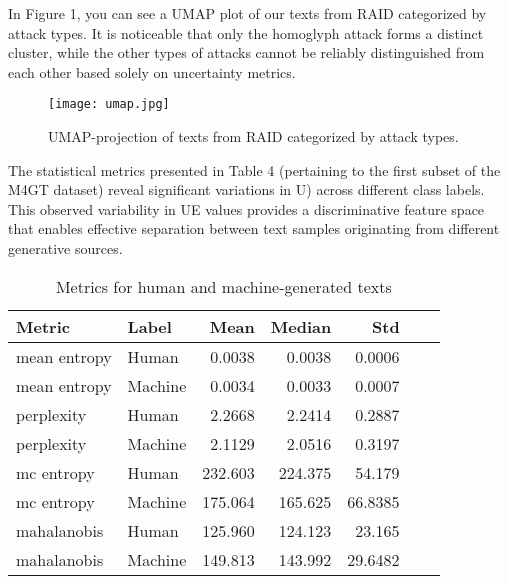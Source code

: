 \documentclass[a4paper, 12pt]{article}
\begin{document}
In Figure 1, you can see a UMAP plot of our texts from RAID categorized by attack types. It is noticeable that only the homoglyph attack forms a distinct cluster, while the other types of attacks cannot be reliably distinguished from each other based solely on uncertainty metrics.

\begin{figure}[ht]
  \centering
  \texttt{[image: umap.jpg]}
  \caption{
    UMAP-projection of texts from RAID categorized by attack types.   }
  \label{fig:umap}
\end{figure}

The statistical metrics presented in Table 4 (pertaining to the first subset of the M4GT dataset) reveal significant variations in U) across different class labels. This observed variability in UE values provides a discriminative feature space that enables effective separation between text samples originating from different generative sources.

\begin{table}[ht]
\centering
\begin{tabular}{llrrrrr}
\toprule
\textbf{Metric} & \textbf{Label} & \textbf{Mean} & \textbf{Median} & \textbf{Std}  \\
\midrule
mean entropy   & Human   & 0.0038   & 0.0038   & 0.0006    \\
mean entropy   & Machine   & 0.0034   & 0.0033   & 0.0007   \\
perplexity    & Human   & 2.2668   & 2.2414   & 0.2887   \\
perplexity    & Machine   & 2.1129   & 2.0516   & 0.3197  \\
mc entropy    & Human   & 232.603  & 224.375  & 54.179   \\
mc entropy    & Machine   & 175.064  & 165.625  & 66.8385  \\
mahalanobis   & Human   & 125.960  & 124.123  & 23.165  \\
mahalanobis   & Machine   & 149.813  & 143.992  & 29.6482   \\
\bottomrule
\end{tabular}
\caption{Metrics for human and machine-generated texts}
\label{tab:metric-by-label}
\end{table}
\end{document}
